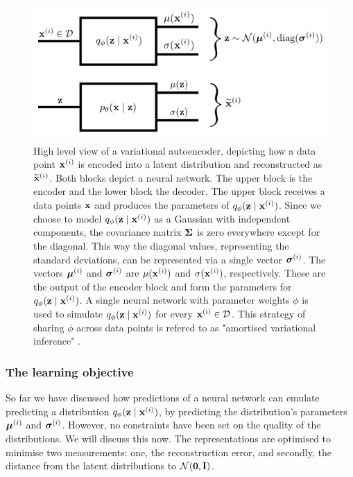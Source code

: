 \begin{figure}
	\centering
	\includegraphics[width=0.6\linewidth]{"vae repr"}
	\caption{High level view of a variational autoencoder, depicting how a data point $\mathbf{x}^{(i)}$ is encoded into a latent distribution and reconstructed as $\widetilde{\mathbf{x}} ^ {(i)}$. Both blocks depict a neural network. The upper block is the encoder and the lower block the decoder. The upper block receives a data points $\mathbf{x}$ and produces the parameters of $q_\phi (\mathbf{z} \mid \mathbf{x}^{(i)})$. Since we choose to model $q_\phi (\mathbf{z} \mid \mathbf{x}^{(i)})$ as a Gaussian with independent components, the covariance matrix $\mathbf{\Sigma}$ is zero everywhere except for the diagonal. This way the diagonal values, representing the standard deviations, can be represented via a single vector $\bm{\sigma}^{(i)}$. The vectors $\bm{\mu}^{(i)}$ and $\bm{\sigma}^{(i)}$ are $\mu(\mathbf{x}^{(i)})$ and $\sigma(\mathbf{x}^{(i)})$, respectively. These are the output of the encoder block and form the parameters for $q_\phi (\mathbf{z} \mid \mathbf{x}^{(i)})$. A single neural network with parameter weights $\phi$ is used to simulate $q_\phi (\mathbf{z} \mid \mathbf{x}^{(i)})$ for every $\mathbf{x}^{(i)} \in \mathcal{D} $. This strategy of sharing $\phi$ across data points is refered to as "amortised variational inference" \cite{kingmaIntroductionVariationalAutoencoders2019}.}
	\label{fig:vae-repr}
\end{figure}

%
%
%
%
%
%

\subsubsection{The learning objective}
	
	So far we have discussed how predictions of a neural network can emulate predicting a distribution $q_\phi (\mathbf{z} \mid \mathbf{x}^{(i)})$, by predicting the distribution's parameters $\bm{\mu}^{(i)}$ and $\bm{\sigma}^{(i)}$. However, no constraints have been set on the quality of the distributions. We will discuss this now. The representations are optimised to minimise two measurements: one, the reconstruction error, and secondly, the distance from the latent distributions to $\mathcal{N}(\bm{\mathbf{0}}, \mathbf{I})$.
	
